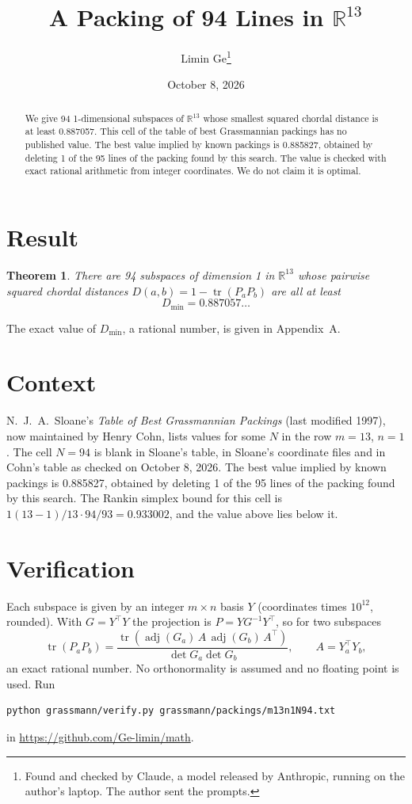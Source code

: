 \documentclass[11pt,a4paper]{article}
\title{A Packing of 94 Lines in $\mathbb{R}^{13}$}
\author{Limin Ge\thanks{Found and checked by Claude, a model released by Anthropic, running on the author's laptop. The author sent the prompts.}}
\date{October 8, 2026}
\newtheorem*{theorem}{Theorem}
\begin{document}
\maketitle
\begin{abstract}
We give 94 1-dimensional subspaces of $\mathbb{R}^{13}$ whose smallest squared chordal distance is at least 0.887057. This cell of the table of best Grassmannian packings has no published value. The best value implied by known packings is 0.885827, obtained by deleting 1 of the 95 lines of the packing found by this search. The value is checked with exact rational arithmetic from integer coordinates. We do not claim it is optimal.
\end{abstract}

\section{Result}
\begin{theorem}
There are 94 subspaces of dimension 1 in $\mathbb{R}^{13}$ whose pairwise squared chordal distances $D(a,b) = 1 - \operatorname{tr}(P_aP_b)$ are all at least
\[ D_{\min} = 0.887057\ldots \]
\end{theorem}
The exact value of $D_{\min}$, a rational number, is given in Appendix~A.


\section{Context}
N.~J.~A.~Sloane's \emph{Table of Best Grassmannian Packings} (last modified 1997), now maintained by Henry Cohn, lists values for some $N$ in the row $m=13$, $n=1$. The cell $N=94$ is blank in Sloane's table, in Sloane's coordinate files and in Cohn's table as checked on October 8, 2026. The best value implied by known packings is 0.885827, obtained by deleting 1 of the 95 lines of the packing found by this search. The Rankin simplex bound for this cell is $1(13-1)/13\cdot 94/93 = 0.933002$, and the value above lies below it.


\section{Verification}
Each subspace is given by an integer $m\times n$ basis $Y$ (coordinates times $10^{12}$, rounded). With $G=Y^\top Y$ the projection is $P=YG^{-1}Y^\top$, so for two subspaces
\[ \operatorname{tr}(P_aP_b)=\frac{\operatorname{tr}(\operatorname{adj}(G_a)\,A\,\operatorname{adj}(G_b)\,A^\top)}{\det G_a\det G_b},\qquad A=Y_a^\top Y_b, \]
an exact rational number. No orthonormality is assumed and no floating point is used. Run
\begin{verbatim}
python grassmann/verify.py grassmann/packings/m13n1N94.txt
\end{verbatim}
in \url{https://github.com/Ge-limin/math}.
\end{document}
